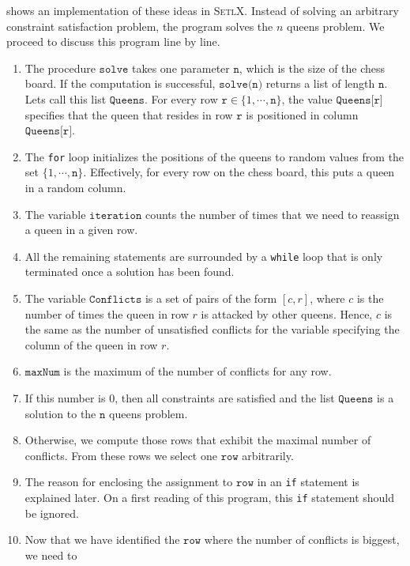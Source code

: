 \noindent
{} shows an implementation of these ideas in \textsc{SetlX}.  Instead of solving an
arbitrary constraint satisfaction problem, the program solves the $n$ queens problem.  We proceed to discuss
this program line by line.
\begin{enumerate}
\item The procedure $\texttt{solve}$ takes one parameter $\texttt{n}$, which is the size of the chess board.  If
      the computation is successful, $\texttt{solve(n)}$ returns a list of length $\texttt{n}$.  Lets call this
      list $\texttt{Queens}$. For every row $\texttt{r} \in \{1, \cdots, \texttt{n}\}$, the value $\texttt{Queens[r]}$ specifies that the queen 
      that resides in row $\texttt{r}$ is positioned in column $\texttt{Queens[r]}$.
\item The \texttt{for} loop initializes the positions of the queens to random values from the set
      $\{1, \cdots, \texttt{n}\}$.  Effectively, for every row on the chess board, this puts a queen in a
      random column.
\item The variable $\texttt{iteration}$ counts the number of times that we need to reassign a queen in a given row.
\item All the remaining statements are surrounded by a \texttt{while} loop that is only terminated once a
      solution has been found.
\item The variable $\texttt{Conflicts}$ is a set of pairs of the form $[c, r]$, where $c$ is the number of
      times the queen in row $r$ is attacked by other queens.  Hence, $c$ is the same as the number of
      unsatisfied conflicts for the variable specifying the column of the queen in row $r$.
\item $\texttt{maxNum}$ is the maximum of the number of conflicts for any row.
\item If this number is $0$, then all constraints are satisfied and the list $\texttt{Queens}$ is a solution to the
      $\texttt{n}$ queens problem.
\item Otherwise, we compute those rows that exhibit the maximal number of conflicts.  From these rows
      we select one $\texttt{row}$ arbitrarily.
\item The reason for enclosing the assignment to $\texttt{row}$ in an \texttt{if} statement is explained later. 
      On a first reading of  this program,  this \texttt{if} statement should be ignored.
\item Now that we have identified the $\texttt{row}$ where the number of conflicts is biggest, we need to

\end{enumerate}
